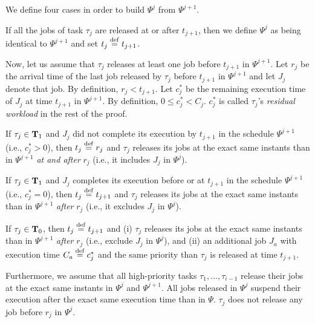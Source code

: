 We define four cases in order to build $\Psi^j$ from $\Psi^{j+1}$.

 If all the jobs of task $\tau_j$ are released at or after $t_{j+1}$, then we define $\Psi^j$ as being identical to $\Psi^{j+1}$ and set $t_j \stackrel{\mathrm{def}}{=} t_{j+1}$. 


Now, let us assume that $\tau_j$ releases at least one job before $t_{j+1}$ in $\Psi^{j+1}$. Let $r_j$ be the arrival time of the last job released by $\tau_j$ before $t_{j+1}$ in $\Psi^{j+1}$ and let $J_{j}$ denote that job. By definition, $r_j < t_{j+1}$. Let $c_j^*$ be the remaining execution time of $J_j$ at time $t_{j+1}$ in $\Psi^{j+1}$. By definition, $0 \leq c_j^* < C_j$. $c_j^*$ is called $\tau_j$'s \emph{residual workload} in the rest of the proof.

 If $\tau_j \in {\bf T}_1$ and $J_{j}$ did not complete its execution by $t_{j+1}$ in the schedule $\Psi^{j+1}$ (i.e., $c_j^*>0$), then $t_j \stackrel{\mathrm{def}}{=} r_j$ and $\tau_j$ releases its jobs at the exact same instants than in $\Psi^{j+1}$ \emph{at and after} $r_j$ (i.e., it includes $J_j$ in $\Psi^j$). 

 If $\tau_j \in {\bf T}_1$ and $J_{j}$ completes its execution before or at $t_{j+1}$ in the schedule $\Psi^{j+1}$ (i.e., $c_j^* = 0$), then $t_j \stackrel{\mathrm{def}}{=} t_{j+1}$ and $\tau_j$ releases its jobs at the exact same instants than in $\Psi^{j+1}$ \emph{after} $r_j$ (i.e., it excludes $J_j$ in $\Psi^j$).

 If $\tau_j \in {\bf T}_0$, then $t_j \stackrel{\mathrm{def}}{=} t_{j+1}$ and (i) $\tau_j$ releases its jobs at the exact same instants than in $\Psi^{j+1}$ \emph{after} $r_j$ (i.e., exclude $J_j$ in $\Psi^j$), and (ii) an additional job $J_a$ with execution time $C_a \stackrel{\mathrm{def}}{=} c_j^*$ and the same priority than $\tau_j$ is released at time $t_{j+1}$.

Furthermore, we assume that all high-priority tasks $\tau_1, \ldots, \tau_{i-1}$ release their jobs at the exact same instants in $\Psi^{j}$ and $\Psi^{j+1}$. All jobs released in $\Psi^j$ suspend their execution after the exact same execution time than in $\Psi$. $\tau_j$ does not release any job before $r_j$ in $\Psi^j$.

